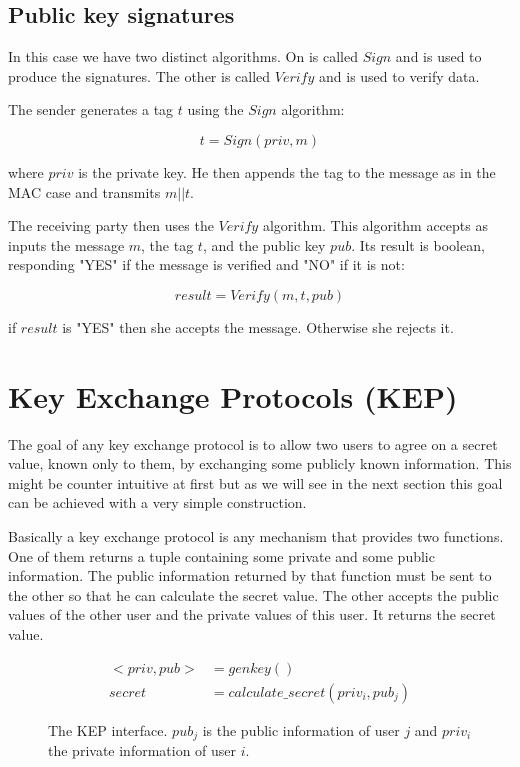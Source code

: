 \subsection{Public key signatures}

In this case we have two distinct algorithms.
On is called $Sign$ and is used to produce the signatures.
The other is called $Verify$ and is used to verify data.

The sender generates a tag $t$ using the $Sign$ algorithm:

\[
  t = Sign(priv, m)
\]

where $priv$ is the private key.
He then appends the tag to the message as in the MAC case and transmits $m||t$.

The receiving party then uses the $Verify$ algorithm.
This algorithm accepts as inputs the message $m$, the tag $t$, and the public key $pub$.
Its result is boolean, responding "YES" if the message is verified and "NO" if it is not:

\[
  result = Verify(m,t,pub)
\]

if $result$ is "YES" then she accepts the message. Otherwise she rejects it.

\section{Key Exchange Protocols (KEP)}

The goal of any key exchange protocol is to allow two users to agree on a secret value, known only to them, by exchanging some publicly known information.
This might be counter intuitive at first but as we will see in the next section this goal can be achieved with a very simple construction.

Basically a key exchange protocol is any mechanism that provides two functions.
One of them returns a tuple containing some private and some public information.
The public information returned by that function must be sent to the other so that he can calculate the secret value.
The other accepts the public values of the other user and the private values of this user.
It returns the secret value.

\begin{figure}[H]
  \begin{align*}
    <priv, pub> &= genkey() \\
    secret &= calculate\_secret(priv_i, pub_j)
  \end{align*}
  \caption[The interface of a Key Exchange Protocol]{The KEP interface. $pub_j$ is the public information of user $j$ and $priv_i$ the private information of user $i$.}
\end{figure}

